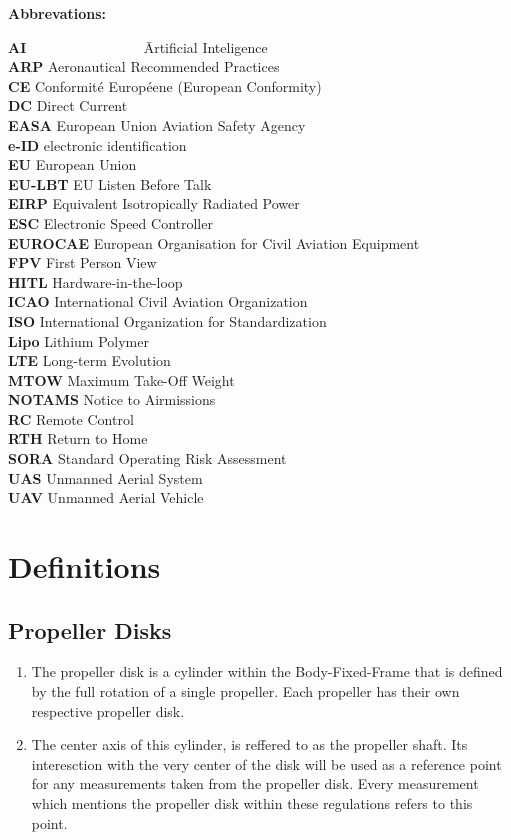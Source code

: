\documentclass{article}
\begin{document}
{\bf Abbrevations:}
\begin{tabbing}
  {\bf AI~~~~~~~~~~~~~~} \= Artificial Inteligence
  \\{\bf ARP} \> Aeronautical Recommended Practices
  \\{\bf CE} \> Conformité Européene (European Conformity)
  \\{\bf DC} \> Direct Current
  \\{\bf EASA} \> European Union Aviation Safety Agency
  \\{\bf e-ID} \> electronic identification
  \\{\bf EU} \> European Union
  \\{\bf EU-LBT} \> EU Listen Before Talk
  \\{\bf EIRP} \> Equivalent Isotropically Radiated Power
  \\{\bf ESC} \> Electronic Speed Controller
  \\{\bf EUROCAE} \> European Organisation for Civil Aviation Equipment
  \\{\bf FPV} \> First Person View
  \\{\bf HITL} \> Hardware-in-the-loop
  \\{\bf ICAO} \> International Civil Aviation Organization
  \\{\bf ISO} \> International Organization for Standardization
  \\{\bf Lipo} \> Lithium Polymer
  \\{\bf LTE} \> Long-term Evolution
  \\{\bf MTOW} \> Maximum Take-Off Weight
  \\{\bf NOTAMS} \> Notice to Airmissions
  \\{\bf RC} \> Remote Control
  \\{\bf RTH} \> Return to Home
  \\{\bf SORA} \> Standard Operating Risk Assessment
  \\{\bf UAS} \> Unmanned Aerial System
  \\{\bf UAV} \> Unmanned Aerial Vehicle
\end{tabbing}




\newpage
\section{Definitions}
\subsection{Propeller Disks}
\begin{enumerate}
  \item The propeller disk is a cylinder within the Body-Fixed-Frame that is defined by the full rotation of a single propeller. Each propeller has their own respective propeller disk. 
  \item The center axis of this cylinder, is reffered to as the propeller shaft. Its interesction with the very center of the disk will be used as a reference point for any measurements taken from the propeller disk. Every measurement which mentions the propeller disk within these regulations refers to this point.
\end{enumerate}
\end{document}
